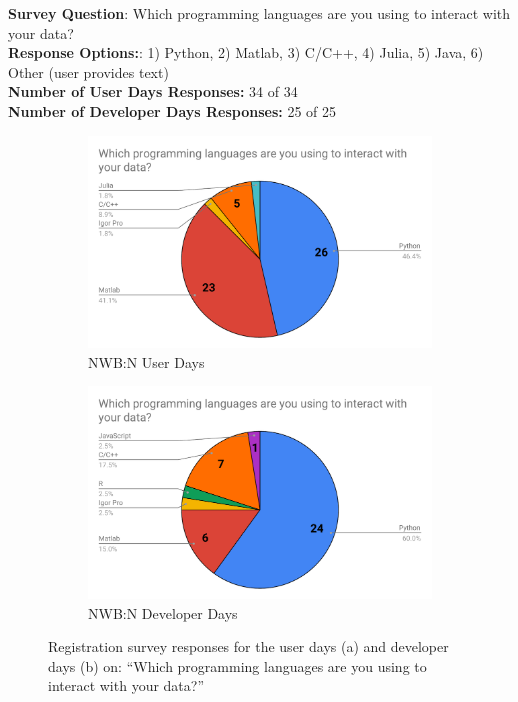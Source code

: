 \documentclass{article}
\begin{document}
{\setlength{\parindent}{0cm}
\textbf{Survey Question}: Which programming languages are you using to interact with your data? \\
\textbf{Response Options:}: 1) Python, 2) Matlab, 3) C/C++, 4) Julia, 5) Java, 6) Other (user provides text) \\
\textbf{Number of User Days Responses:} 34 of 34 \\ 
\textbf{Number of Developer Days Responses:} 25 of 25 
}

\begin{figure}[h!]
   \begin{subfigure}[b]{0.49\textwidth}
        \includegraphics[width=\textwidth]{figures/users_nwb_programlang_presurvey.pdf}
        \caption{NWB:N User Days}
    \end{subfigure}
    \begin{subfigure}[b]{0.49\textwidth}
        \includegraphics[width=\textwidth]{figures/developers_nwb_programlang_presurvey.pdf}
        \caption{NWB:N Developer Days}
    \end{subfigure}
    \caption{Registration survey responses for the user days (a) and developer days (b) on: ``Which programming languages are you using to interact with your data?''}
\end{figure}
\end{document}

